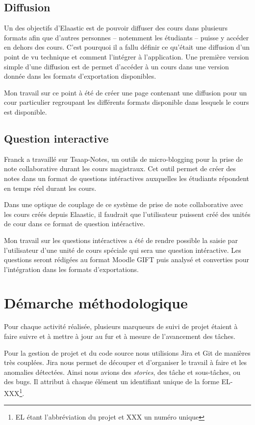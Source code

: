 \subsection{Diffusion}
Un des objectifs d'Elaastic est de pouvoir diffuser des cours dans plusieurs
formats afin que d'autres personnes -- notemment les étudiants -- puisse y
accéder en dehors des cours. C'est pourquoi il a fallu définir ce qu'était une
diffusion d'un point de vu technique et comment l'intégrer à l'application. Une
première version simple d'une diffusion est de permet d'accéder à un cours dans
une version donnée dans les formats d'exportation disponibles.

Mon travail sur ce point à été de créer une page contenant une diffusion pour un
cour particulier regroupant les différents formats disponible dans lesquels le
cours est disponible.

\subsection{Question interactive}
Franck a travaillé sur Tsaap-Notes, un outils de micro-blogging pour la prise de
note collaborative durant les cours magistraux. Cet outil permet de créer des
notes dans un format de questions intéractives auxquelles les étudiants
répondent en temps réel durant les cours.

Dans une optique de couplage de ce système de prise de note collaborative avec
les cours créés depuis Elaastic, il faudrait que l'utilisateur puissent créé des
unités de cour dans ce format de question intéractive.

Mon travail sur les questions intéractives a été de rendre possible la saisie par
l'utilisateur d'une unité de cours spéciale qui sera une question intéractive.
Les questions seront rédigées au format Moodle GIFT puis analysé et converties
pour l'intégration dans les formats d'exportations.

\section{Démarche méthodologique}
Pour chaque activité réalisée, plusieurs marqueurs de suivi de projet étaient à
faire suivre et à mettre à jour au fur et à mesure de l'avancement des tâches.

Pour la gestion de projet et du code source nous utilisions Jira et Git de
manières très couplées. Jira nous permet de découper et d'organiser le travail à
faire et les anomalies détectées. Ainsi nous avions des {\em stories}, des tâche
et sous-tâches, ou des bugs. Il attribut à chaque élément un identifiant unique
de la forme EL-XXX\footnote{EL étant l'abbréviation du projet et XXX un numéro
unique}.

